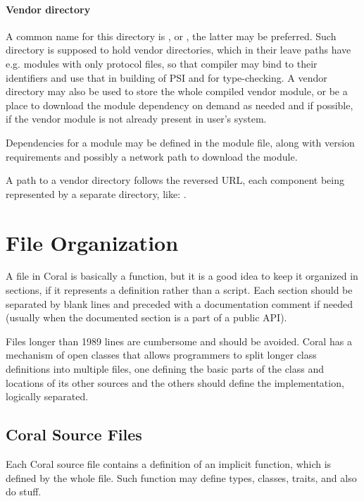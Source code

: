 \paragraph{Vendor directory}
A common name for this directory is , or , the latter may be preferred. Such directory is supposed to hold vendor directories, which in their leave paths have e.g. modules with only protocol files, so that compiler may bind to their identifiers and use that in building of PSI and for type-checking. A vendor directory may also be used to store the whole compiled vendor module, or be a place to download the module dependency on demand as needed and if possible, if the vendor module is not already present in user's system. 

Dependencies for a module may be defined in the module file, along with version requirements and possibly a network path to download the module. 

A path to a vendor directory follows the reversed URL, each component being represented by a separate directory, like: . 





\section{File Organization}

A file in Coral is basically a function, but it is a good idea to keep it organized in sections, if it represents a definition rather than a script. Each section should be separated by blank lines and preceded with a documentation comment if needed (usually when the documented section is a part of a public API). 

Files longer than 1989 lines are cumbersome and should be avoided. Coral has a mechanism of open classes that allows programmers to split longer class definitions into multiple files, one defining the basic parts of the class and locations of its other sources and the others should define the implementation, logically separated. 





\subsection{Coral Source Files}

Each Coral source file contains a definition of an implicit function, which is defined by the whole file. Such function may define types, classes, traits, and also do stuff. 

